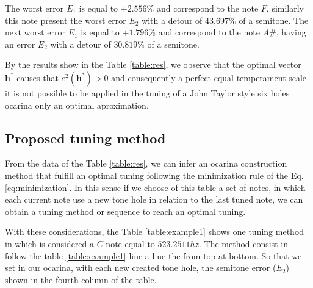 \documentclass[11pt,twocolumn]{article}
\begin{document}
The worst error $E_1$ is equal to $+2.556\%$ and correspond to the note $F$,
similarly this note present the worst error $E_2$ with a detour of $43.697\%$ of a semitone.
The next worst error $E_1$ is equal to $+1.796\%$ and correspond to the note $A\#$,
having an error $E_2$ with a detour of $30.819\%$ of a semitone.

By the results show in the Table \ref{table:res}, we observe that 
the optimal vector $\mathbf{h^*}$ causes that $e^2(\mathbf{h^*})> 0$
and consequently a perfect equal temperament scale 
it is not possible to be applied in the tuning of a John Taylor style six holes ocarina
only an optimal aproximation.

\subsection{Proposed tuning method}
From the data of the Table \ref{table:res}, 
we can infer an ocarina construction method that fulfill 
an optimal tuning following the minimization rule of the Eq. \ref{eq:minimization}.
In this sense if we choose of this table a set of notes, 
in which each current note use a new tone hole in relation to the last tuned note, 
we can obtain a tuning method or sequence to reach an optimal tuning.

With these considerations, the Table \ref{table:example1} shows one tuning method 
in which is considered a $C$ note equal to $523.2511 hz$.
The method consist in follow the table \ref{table:example1} line a line the from top at bottom.
So that we set in our ocarina, with each new created tone hole, 
the semitone error ($E_2$) shown in the fourth column of the table.
\end{document}
